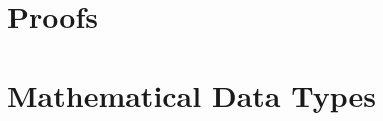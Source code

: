 \documentclass{mcs}
\begin{document}
\frontmatter

%

\mainmatter




\part{Proofs}








\part{Mathematical Data Types}













\end{document}

